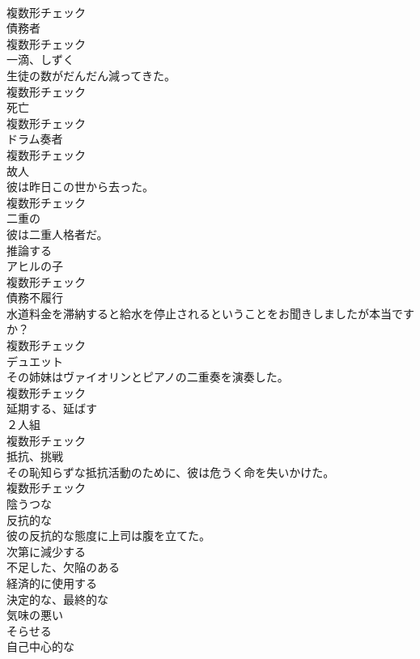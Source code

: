 \documentclass[8pt]{extreport}
\begin{document}
\begin{CJK}{UTF8}{min}
\\	複数形チェック
\\	[名詞]	債務者	
\\	複数形チェック
\\	[名詞]	一滴、しずく	
\\	生徒の数がだんだん減ってきた。	
\\	複数形チェック
\\	[名詞]	死亡	
\\	複数形チェック
\\	[名詞]	ドラム奏者	
\\	複数形チェック
\\	[名詞]	故人	
\\	彼は昨日この世から去った。	
\\	複数形チェック
\\	[形容詞]	二重の	
\\	彼は二重人格者だ。	
\\	[動詞]	推論する	
\\	[名詞]	アヒルの子	
\\	複数形チェック
\\	[名詞]	債務不履行	
\\	水道料金を滞納すると給水を停止されるということをお聞きしましたが本当ですか？	
\\	複数形チェック
\\	[名詞]	デュエット	
\\	その姉妹はヴァイオリンとピアノの二重奏を演奏した。	
\\	複数形チェック
\\	[動詞]	延期する、延ばす	
\\	[名詞]	２人組	
\\	複数形チェック
\\	[名詞]	抵抗、挑戦	
\\	その恥知らずな抵抗活動のために、彼は危うく命を失いかけた。	
\\	複数形チェック
\\	[形容詞]	陰うつな	
\\	[形容詞]	反抗的な	
\\	彼の反抗的な態度に上司は腹を立てた。	
\\	[動詞]	次第に減少する	
\\	[形容詞]	不足した、欠陥のある	
\\	[動詞]	経済的に使用する	
\\	[形容詞]	決定的な、最終的な	
\\	[形容詞]	気味の悪い	
\\	[動詞]	そらせる	
\\	[形容詞]	自己中心的な	

\end{CJK}
\end{document}
